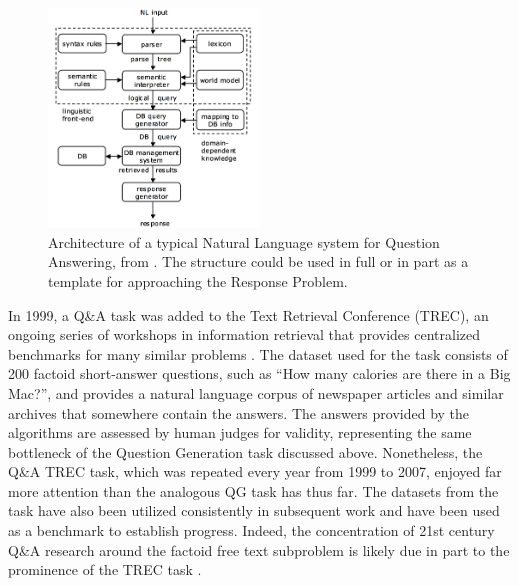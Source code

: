 \begin{figure}[h]
\centerline{%
\includegraphics[width=0.5\textwidth]{figures/NLPQA.png}}%
\caption{Architecture of a typical Natural Language system for Question Answering, from \cite{androutsopoulos1995natural}. The structure could be used in full or in part as a template for approaching the Response Problem.}
\label{fig:NLPQA}
\end{figure}

In 1999, a Q\&A task was added to the Text Retrieval Conference (TREC), an ongoing series of workshops in information retrieval that provides centralized benchmarks for many similar problems \cite{voorhees1999trec}. The dataset used for the task consists of 200 factoid short-answer questions, such as ``How many calories are there in a Big Mac?'', and provides a natural language corpus of newspaper articles and similar archives that somewhere contain the answers. The answers provided by the algorithms are assessed by human judges for validity, representing the same bottleneck of the Question Generation task discussed above. Nonetheless, the Q\&A TREC task, which was repeated every year from 1999 to 2007, enjoyed far more attention than the analogous QG task has thus far\cite{dang2007overview}. The datasets from the task have also been utilized consistently in subsequent work and have been used as a benchmark to establish progress. Indeed, the concentration of 21st century Q\&A research around the factoid free text subproblem is likely due in part to the prominence of the TREC task \cite{hirschman2001natural}.

